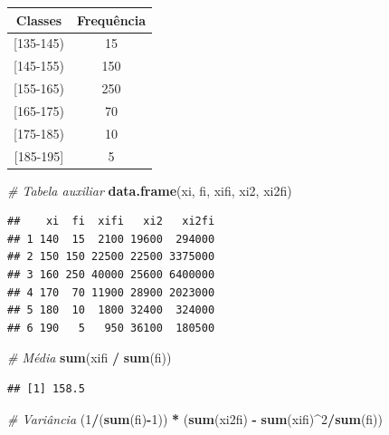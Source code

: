 \documentclass[]{article}
\newenvironment{Shaded}{\begin{snugshade}}{\end{snugshade}}
\newcommand{\KeywordTok}[1]{\textcolor[rgb]{0.13,0.29,0.53}{\textbf{#1}}}
\newcommand{\DecValTok}[1]{\textcolor[rgb]{0.00,0.00,0.81}{#1}}
\newcommand{\StringTok}[1]{\textcolor[rgb]{0.31,0.60,0.02}{#1}}
\newcommand{\CommentTok}[1]{\textcolor[rgb]{0.56,0.35,0.01}{\textit{#1}}}
\newcommand{\OperatorTok}[1]{\textcolor[rgb]{0.81,0.36,0.00}{\textbf{#1}}}
\newcommand{\NormalTok}[1]{#1}
\begin{document}
\begin{table}[H]
\centering
\begin{tabular}{cc}
\hline
Classes     & Frequência \\ \hline
{[}135-145) & 15         \\
{[}145-155) & 150        \\
{[}155-165) & 250        \\
{[}165-175) & 70         \\
{[}175-185) & 10         \\
{[}185-195] & 5          \\ \hline
\end{tabular}
\end{table}

\begin{Shaded}
\begin{Highlighting}[]
\CommentTok{# Tabela auxiliar}
\KeywordTok{data.frame}\NormalTok{(xi, fi, xifi, xi2, xi2fi)}
\end{Highlighting}
\end{Shaded}

\begin{verbatim}
##    xi  fi  xifi   xi2   xi2fi
## 1 140  15  2100 19600  294000
## 2 150 150 22500 22500 3375000
## 3 160 250 40000 25600 6400000
## 4 170  70 11900 28900 2023000
## 5 180  10  1800 32400  324000
## 6 190   5   950 36100  180500
\end{verbatim}

\begin{Shaded}
\begin{Highlighting}[]
\CommentTok{# Média}
\KeywordTok{sum}\NormalTok{(xifi }\OperatorTok{/}\StringTok{ }\KeywordTok{sum}\NormalTok{(fi))}
\end{Highlighting}
\end{Shaded}

\begin{verbatim}
## [1] 158.5
\end{verbatim}

\begin{Shaded}
\begin{Highlighting}[]
\CommentTok{# Variância}
\NormalTok{(}\DecValTok{1}\OperatorTok{/}\NormalTok{(}\KeywordTok{sum}\NormalTok{(fi)}\OperatorTok{-}\DecValTok{1}\NormalTok{)) }\OperatorTok{*}\StringTok{ }\NormalTok{(}\KeywordTok{sum}\NormalTok{(xi2fi) }\OperatorTok{-}\StringTok{ }\KeywordTok{sum}\NormalTok{(xifi)}\OperatorTok{^}\DecValTok{2}\OperatorTok{/}\KeywordTok{sum}\NormalTok{(fi))}
\end{Highlighting}
\end{Shaded}
\end{document}
